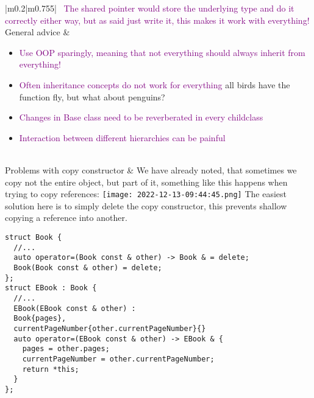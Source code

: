 \documentclass[main.tex,fontsize=8pt,paper=a4,paper=portrait,DIV=calc,]{scrartcl}
\begin{document}
\begin{table}[ht!]
\begin{tabular}{|m{0.2\linewidth}|m{0.755\linewidth}|}
\, \newline
\textcolor{purple}{The shared pointer would store the underlying type and do it correctly either way, but as said just write it, this makes it work with everything!}\\
\hline
General advice & 
\vspace{2mm}
\begin{itemize}
\item \textcolor{purple}{Use OOP sparingly, meaning that not everything should always inherit from everything!}
\item \textcolor{purple}{Often inheritance concepts do not work for everything}\newline
  all birds have the function fly, but what about penguins?
\item \textcolor{purple}{Changes in Base class need to be reverberated in every childclass}
\item \textcolor{purple}{Interaction between different hierarchies can be painful}
\vspace{-3mm}
\end{itemize} 
\\
\hline
Problems with copy constructor & 
We have already noted, that sometimes we copy not the entire object, but part of it, something like this happens when trying to copy references:\newline
\texttt{[image: 2022-12-13-09:44:45.png]}\newline
The easiest solution here is to simply delete the copy constructor, this prevents shallow copying a reference into another.\newline
\begin{lstlisting}
struct Book {
  //...
  auto operator=(Book const & other) -> Book & = delete;
  Book(Book const & other) = delete;
};
struct EBook : Book {
  //...
  EBook(EBook const & other) :
  Book{pages},
  currentPageNumber{other.currentPageNumber}{}
  auto operator=(EBook const & other) -> EBook & {
    pages = other.pages;
    currentPageNumber = other.currentPageNumber;
    return *this;
  }
};
\end{lstlisting}
\\
\hline
\end{tabular}
\end{table}
\pagebreak
\end{document}
